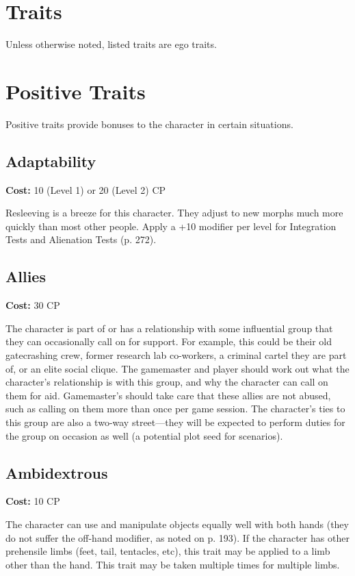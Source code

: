 \section{Traits} Unless otherwise noted, listed traits are ego traits.

\section{Positive Traits}
\label{sec:positive-traits}
Positive traits provide bonuses to the character in certain situations.

\subsection{Adaptability}
\label{sec:traits-adaptability}

\textbf{Cost:} 10 (Level 1) or 20 (Level 2) CP

Resleeving is a breeze for this character. They adjust to new morphs much more quickly than most other people. Apply a +10 modifier per level for Integration Tests and Alienation Tests (p. 272).

\subsection{Allies}
\label{sec:traits-allies}

\textbf{Cost:} 30 CP

The character is part of or has a relationship with some influential group that they can occasionally call on for support. For example, this could be their old gatecrashing crew, former research lab co-workers, a criminal cartel they are part of, or an elite social clique. The gamemaster and player should work out what the character’s relationship is with this group, and why the character can call on them for aid. Gamemaster’s should take care that these allies are not abused, such as calling on them more than once per game session. The character’s ties to this group are also a two-way street—they will be expected to perform duties for the group on occasion as well (a potential plot seed for scenarios).

\subsection{Ambidextrous}
\label{sec:traits-ambidextrous}

\textbf{Cost:} 10 CP

The character can use and manipulate objects equally well with both hands (they do not suffer the off-hand modifier, as noted on p. 193). If the character has other prehensile limbs (feet, tail, tentacles, etc), this trait may be applied to a limb other than the hand. This trait may be taken multiple times for multiple limbs.

